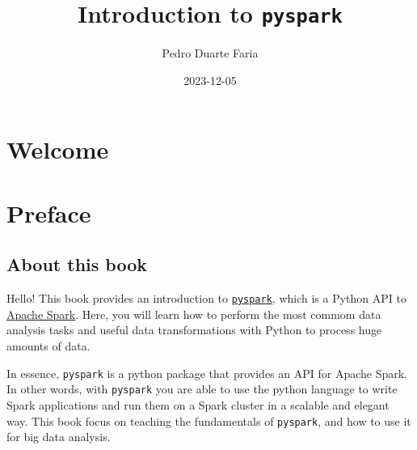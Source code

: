 \documentclass[
  11pt,
  letterpaper,
  DIV=11,
  numbers=noendperiod]{scrreprt}
\title{Introduction to \texttt{pyspark}}
\author{Pedro Duarte Faria}
\date{2023-12-05}
\renewcommand*\contentsname{Table of contents}
\newcommand\contentsname{Table of contents}
\begin{document}
\maketitle
\ifdefined\Shaded\renewenvironment{Shaded}{\begin{tcolorbox}[enhanced, sharp corners, frame hidden, borderline west={3pt}{0pt}{shadecolor}, boxrule=0pt, interior hidden, breakable]}{\end{tcolorbox}}\fi

\renewcommand*\contentsname{Table of contents}
{
\hypersetup{linkcolor=}
\setcounter{tocdepth}{2}
\tableofcontents
}

\hypertarget{welcome}{%
\chapter*{Welcome}\label{welcome}}



\hypertarget{preface}{%
\chapter*{Preface}\label{preface}}


\hypertarget{about-this-book-1}{%
\section*{About this book}\label{about-this-book-1}}


Hello! This book provides an introduction to
\href{https://spark.apache.org/docs/latest/api/python/}{\texttt{pyspark}},
which is a Python API to \href{https://spark.apache.org/}{Apache Spark}.
Here, you will learn how to perform the most commom data analysis tasks
and useful data transformations with Python to process huge amounts of
data.

In essence, \texttt{pyspark} is a python package that provides an API
for Apache Spark. In other words, with \texttt{pyspark} you are able to
use the python language to write Spark applications and run them on a
Spark cluster in a scalable and elegant way. This book focus on teaching
the fundamentals of \texttt{pyspark}, and how to use it for big data
analysis.
\end{document}
